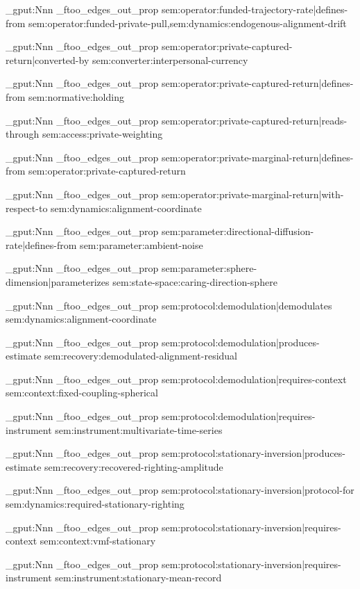 \prop_gput:Nnn \g_ftoo_edges_out_prop { sem:operator:funded-trajectory-rate|defines-from } { sem:operator:funded-private-pull,sem:dynamics:endogenous-alignment-drift }

\prop_gput:Nnn \g_ftoo_edges_out_prop { sem:operator:private-captured-return|converted-by } { sem:converter:interpersonal-currency }

\prop_gput:Nnn \g_ftoo_edges_out_prop { sem:operator:private-captured-return|defines-from } { sem:normative:holding }

\prop_gput:Nnn \g_ftoo_edges_out_prop { sem:operator:private-captured-return|reads-through } { sem:access:private-weighting }

\prop_gput:Nnn \g_ftoo_edges_out_prop { sem:operator:private-marginal-return|defines-from } { sem:operator:private-captured-return }

\prop_gput:Nnn \g_ftoo_edges_out_prop { sem:operator:private-marginal-return|with-respect-to } { sem:dynamics:alignment-coordinate }

\prop_gput:Nnn \g_ftoo_edges_out_prop { sem:parameter:directional-diffusion-rate|defines-from } { sem:parameter:ambient-noise }

\prop_gput:Nnn \g_ftoo_edges_out_prop { sem:parameter:sphere-dimension|parameterizes } { sem:state-space:caring-direction-sphere }

\prop_gput:Nnn \g_ftoo_edges_out_prop { sem:protocol:demodulation|demodulates } { sem:dynamics:alignment-coordinate }

\prop_gput:Nnn \g_ftoo_edges_out_prop { sem:protocol:demodulation|produces-estimate } { sem:recovery:demodulated-alignment-residual }

\prop_gput:Nnn \g_ftoo_edges_out_prop { sem:protocol:demodulation|requires-context } { sem:context:fixed-coupling-spherical }

\prop_gput:Nnn \g_ftoo_edges_out_prop { sem:protocol:demodulation|requires-instrument } { sem:instrument:multivariate-time-series }

\prop_gput:Nnn \g_ftoo_edges_out_prop { sem:protocol:stationary-inversion|produces-estimate } { sem:recovery:recovered-righting-amplitude }

\prop_gput:Nnn \g_ftoo_edges_out_prop { sem:protocol:stationary-inversion|protocol-for } { sem:dynamics:required-stationary-righting }

\prop_gput:Nnn \g_ftoo_edges_out_prop { sem:protocol:stationary-inversion|requires-context } { sem:context:vmf-stationary }

\prop_gput:Nnn \g_ftoo_edges_out_prop { sem:protocol:stationary-inversion|requires-instrument } { sem:instrument:stationary-mean-record }

